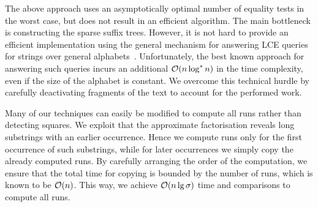 The above approach uses an asymptotically optimal number of equality tests in the worst case, but does not result in an efficient
algorithm. The main bottleneck is constructing the sparse suffix trees. However, it is not hard to provide an efficient implementation
using the general mechanism for answering LCE queries for strings over general alphabets~\cite{Gawrychowski2016}.
Unfortunately, the best known approach for answering such queries incurs an additional $\mathcal{O}(n\log^{*}n)$ in the time complexity,
even if the size of the alphabet is constant. We overcome this technical hurdle by carefully deactivating fragments
of the text to account for the performed work.

Many of our techniques can easily be modified to compute all runs rather than detecting squares. We exploit that the approximate
factorisation reveals long substrings with an earlier occurrence. Hence we compute runs only for the first occurrence of such substrings,
while for later occurrences we simply copy the already computed runs.
By carefully arranging the order of the computation, we ensure that the total time for copying is bounded by the number
of runs, which is known to be $\mathcal{O}(n)$.
This way, we achieve $\mathcal{O}(n \lg \sigma)$ time and comparisons to compute all runs.

